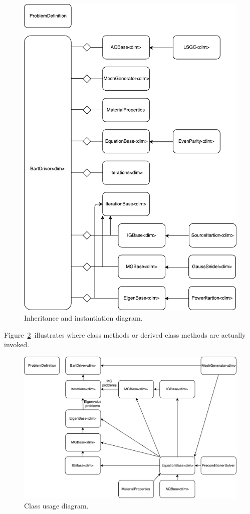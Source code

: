 \documentclass{article}
\begin{document}
\begin{figure}
	\centering
	\includegraphics[scale=0.7]{pics/instantiation-inheritance}
	\caption{Inheritance and instantiation diagram.}
	\label{f:inheritance-instantiation}
\end{figure}

Figure\ \ref{f:class-usage}\ illustrates where class methods or derived class methods are actually invoked.

\begin{figure}
	\centering
	\includegraphics[scale=0.7]{pics/class-usage}
	\caption{Class usage diagram.}
	\label{f:class-usage}
\end{figure}
\end{document}
